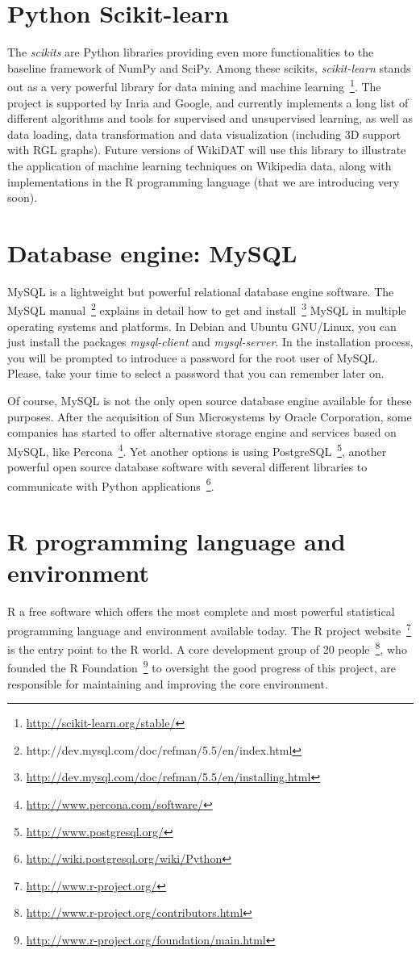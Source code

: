 \section{Python Scikit-learn}
The \textit{scikits} are Python libraries providing even more functionalities to
the baseline framework of NumPy and SciPy. Among these scikits, \textit{scikit-learn}
stands out as a very powerful library for data mining and machine 
learning~\footnote{\url{http://scikit-learn.org/stable/}}. The project is supported
by Inria and Google, and currently implements a long list of different algorithms
and tools for supervised and unsupervised learning, as well as data loading, data
transformation and data visualization (including 3D support with RGL graphs).
Future versions of WikiDAT will use this library to illustrate the application of
machine learning techniques on Wikipedia data, along with implementations in the
R programming language (that we are introducing very soon).

\section{Database engine: MySQL}
MySQL is a lightweight but powerful relational database engine software. The 
MySQL manual~\footnote{\url{}http://dev.mysql.com/doc/refman/5.5/en/index.html} 
explains in detail how to get and 
install~\footnote{\url{http://dev.mysql.com/doc/refman/5.5/en/installing.html}} 
MySQL in multiple operating systems and platforms.
In Debian and Ubuntu GNU/Linux, you can just install the packages \textit{mysql-client} 
and \textit{mysql-server}. In the installation process, you will be prompted to introduce 
a password for the root user of MySQL. Please, take your time to select a 
password that you can remember later on.

Of course, MySQL is not the only open source database engine available for these
purposes. After the acquisition of Sun Microsystems by Oracle Corporation, some
companies has started to offer alternative storage engine and services based
on MySQL, like Percona~\footnote{\url{http://www.percona.com/software/}}. Yet
another options is using PostgreSQL~\footnote{\url{http://www.postgresql.org/}},
another powerful open source database software with several different libraries
to communicate with Python applications~\footnote{\url{http://wiki.postgresql.org/wiki/Python}}. 

\section{R programming language and environment}
R a free software which offers the most complete and most powerful statistical 
programming language and environment available today. The R project website~\footnote{\url{http://www.r-project.org/}} is 
the entry point to the R world. A core development group of 20 people~\footnote{\url{http://www.r-project.org/contributors.html}}, who 
founded the R Foundation~\footnote{\url{http://www.r-project.org/foundation/main.html}} to oversight the good progress of this project, are 
responsible for maintaining and improving the core environment.

